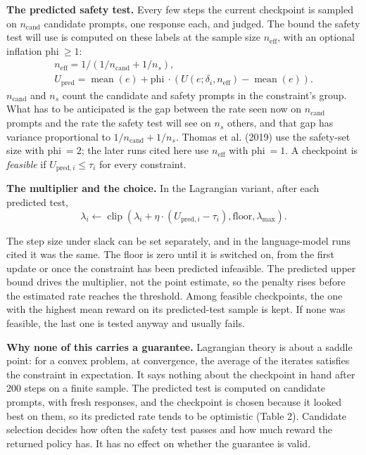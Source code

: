 \documentclass[11pt]{article}
\begin{document}
\textbf{The predicted safety test.} Every few steps the current checkpoint is sampled on $n_{\mathrm{cand}}$ candidate prompts, one response each, and judged. The bound the safety test will use is computed on these labels at the sample size $n_{\mathrm{eff}}$, with an optional inflation $\text{phi}\ \ge 1$:
\begin{gather*}
n_{\mathrm{eff}} = 1 / (1/n_{\mathrm{cand}} + 1/n_{s} ), \\
U_{\mathrm{pred}} = \operatorname{mean} (e ) + \text{phi}\ \cdot ( U (e ; \delta_{i} , n_{\mathrm{eff}} ) - \operatorname{mean} (e ) ).
\end{gather*}
$n_{\mathrm{cand}}$ and $n_{s}$ count the candidate and safety prompts in the constraint's group. What has to be anticipated is the gap between the rate seen now on $n_{\mathrm{cand}}$ prompts and the rate the safety test will see on $n_{s}$ others, and that gap has variance proportional to $1/n_{\mathrm{cand}} + 1/n_{s}$. Thomas et al. (2019) use the safety-set size with $\text{phi}\ = 2$; the later runs cited here use $n_{\mathrm{eff}}$ with $\text{phi}\ = 1$. A checkpoint is \emph{feasible} if $U_{\mathrm{pred},i} \le \tau_{i}$ for every constraint.


\textbf{The multiplier and the choice.} In the Lagrangian variant, after each predicted test,
\[
\lambda_{i} \leftarrow \operatorname{clip} ( \lambda_{i} + \eta \cdot (U_{\mathrm{pred},i} - \tau_{i} ), \text{floor}, \lambda_{\max} ).
\]

The step size under slack can be set separately, and in the language-model runs cited it was the same. The floor is zero until it is switched on, from the first update or once the constraint has been predicted infeasible. The predicted upper bound drives the multiplier, not the point estimate, so the penalty rises before the estimated rate reaches the threshold. Among feasible checkpoints, the one with the highest mean reward on its predicted-test sample is kept. If none was feasible, the last one is tested anyway and usually fails.


\textbf{Why none of this carries a guarantee.} Lagrangian theory is about a saddle point: for a convex problem, at convergence, the average of the iterates satisfies the constraint in expectation. It says nothing about the checkpoint in hand after 200 steps on a finite sample. The predicted test is computed on candidate prompts, with fresh responses, and the checkpoint is chosen because it looked best on them, so its predicted rate tends to be optimistic (Table 2). Candidate selection decides how often the safety test passes and how much reward the returned policy has. It has no effect on whether the guarantee is valid.
\end{document}

